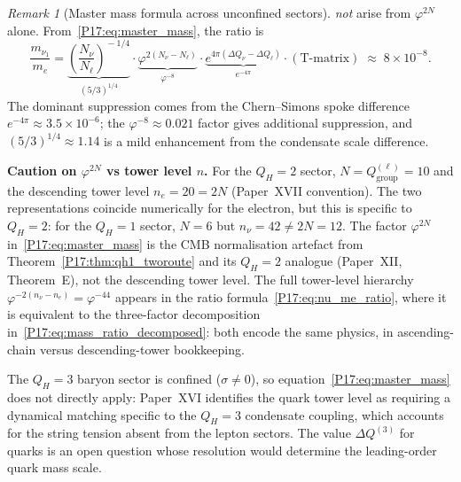 \documentclass[11pt,a4paper]{article}
\theoremstyle{definition}\newtheorem{definition}[theorem]{Definition}
\theoremstyle{remark}
\newtheorem{remark}[theorem]{Remark}
\newcommand{\vp}{\varphi}
\newcommand{\QH}{Q_H}
\begin{document}
\begin{remark}[Master mass formula across unconfined sectors]
\emph{not} arise from $\vp^{2N}$ alone.
From~\eqref{P17:eq:master_mass}, the ratio is
\begin{equation}
  \frac{m_{\nu_1}}{m_e}
  = \underbrace{\left(\frac{N_\nu}{N_\ell}\right)^{\!-1/4}}_{\displaystyle(5/3)^{1/4}}
    \cdot \underbrace{\vp^{2(N_\nu-N_\ell)}}_{\displaystyle\vp^{-8}}
    \cdot \underbrace{e^{4\pi(\Delta Q_\nu-\Delta Q_\ell)}}_{\displaystyle e^{-4\pi}}
    \cdot (\text{T-matrix})
  \;\approx\; 8\times10^{-8}.
  \label{P17:eq:mass_ratio_decomposed}
\end{equation}
The dominant suppression comes from the Chern--Simons spoke
difference $e^{-4\pi}\approx3.5\times10^{-6}$; the
$\vp^{-8}\approx0.021$ factor gives additional suppression, and
$(5/3)^{1/4}\approx1.14$ is a mild enhancement from the condensate
scale difference.

\smallskip\noindent\textbf{Caution on $\vp^{2N}$ vs tower level $n$.}
For the $\QH=2$ sector, $N=Q_{\mathrm{group}}^{(\ell)}=10$ and the
descending tower level $n_e=20=2N$ (Paper~XVII convention).
The two representations coincide numerically for the electron, but this
is specific to $\QH=2$: for the $\QH=1$ sector, $N=6$ but $n_\nu=42\neq2N=12$.
The factor $\vp^{2N}$ in~\eqref{P17:eq:master_mass} is the CMB normalisation
artefact from Theorem~\ref{P17:thm:qh1_tworoute} and its $\QH=2$ analogue
(Paper~XII, Theorem~E), not the descending tower level.
The full tower-level hierarchy $\vp^{-2(n_\nu-n_e)}=\vp^{-44}$
appears in the ratio formula~\eqref{P17:eq:nu_me_ratio}, where it is
equivalent to the three-factor decomposition
in~\eqref{P17:eq:mass_ratio_decomposed}: both encode the same physics,
in ascending-chain versus descending-tower bookkeeping.

\medskip
The $\QH=3$ baryon sector is confined ($\sigma\neq0$), so
equation~\eqref{P17:eq:master_mass} does not directly apply:
Paper~XVI identifies the quark tower level as requiring a dynamical
matching specific to the $\QH=3$ condensate coupling, which accounts
for the string tension absent from the lepton sectors.
The value $\Delta Q^{(3)}$ for quarks is an open question whose
resolution would determine the leading-order quark mass scale.
\end{remark}
\end{document}
